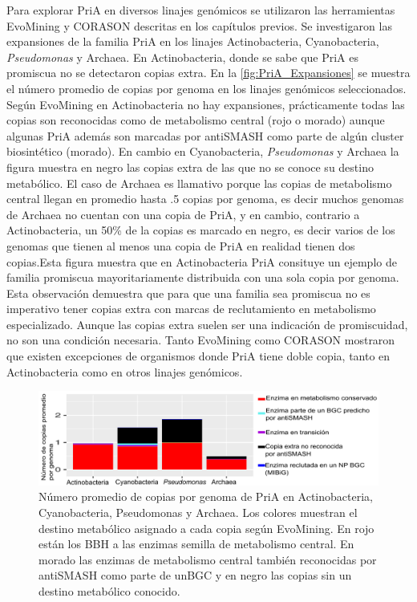 \documentclass[12pt,twoside]{reedthesis}
\begin{document}
  Para explorar PriA en diversos linajes genómicos se utilizaron las
  herramientas EvoMining y CORASON descritas en los capítulos previos. Se
  investigaron las expansiones de la familia PriA en los linajes
  Actinobacteria, Cyanobacteria, \emph{Pseudomonas} y Archaea. En
  Actinobacteria, donde se sabe que PriA es promiscua no se detectaron
  copias extra. En la \autoref{fig:PriA_Expansiones} se muestra el número
  promedio de copias por genoma en los linajes genómicos seleccionados.
  Según EvoMining en Actinobacteria no hay expansiones, prácticamente
  todas las copias son reconocidas como de metabolismo central (rojo o
  morado) aunque algunas PriA además son marcadas por antiSMASH como parte
  de algún cluster biosintético (morado). En cambio en Cyanobacteria,
  \emph{Pseudomonas} y Archaea la figura muestra en negro las copias extra
  de las que no se conoce su destino metabólico. El caso de Archaea es
  llamativo porque las copias de metabolismo central llegan en promedio
  hasta .5 copias por genoma, es decir muchos genomas de Archaea no
  cuentan con una copia de PriA, y en cambio, contrario a Actinobacteria,
  un 50\% de la copias es marcado en negro, es decir varios de los genomas
  que tienen al menos una copia de PriA en realidad tienen dos copias.Esta
  figura muestra que en Actinobacteria PriA consituye un ejemplo de
  familia promiscua mayoritariamente distribuida con una sola copia por
  genoma. Esta observación demuestra que para que una familia sea
  promiscua no es imperativo tener copias extra con marcas de
  reclutamiento en metabolismo especializado. Aunque las copias extra
  suelen ser una indicación de promiscuidad, no son una condición
  necesaria. Tanto EvoMining como CORASON mostraron que existen
  excepciones de organismos donde PriA tiene doble copia, tanto en
  Actinobacteria como en otros linajes genómicos.
  
  \begin{figure}[h!tbp]
  \centering
  \includegraphics[angle = 0,scale = 0.8]{chapter4/PriAExpansiones.png}
  \caption[Expansiones de PriA en Actinobacteria, Cyanobacteria, Pseudomonas y Archaea]{\footnotesize{Número promedio de copias por genoma de PriA en Actinobacteria, Cyanobacteria, Pseudomonas y Archaea. Los colores muestran el destino metabólico asignado a cada copia según EvoMining. En rojo están los BBH a las enzimas semilla de metabolismo central. En morado las enzimas de metabolismo central también reconocidas por antiSMASH como parte de unBGC y en negro las copias sin un destino metabólico conocido.}}
  \label{fig:PriA_Expansiones}
  \end{figure}
  
\end{document}
